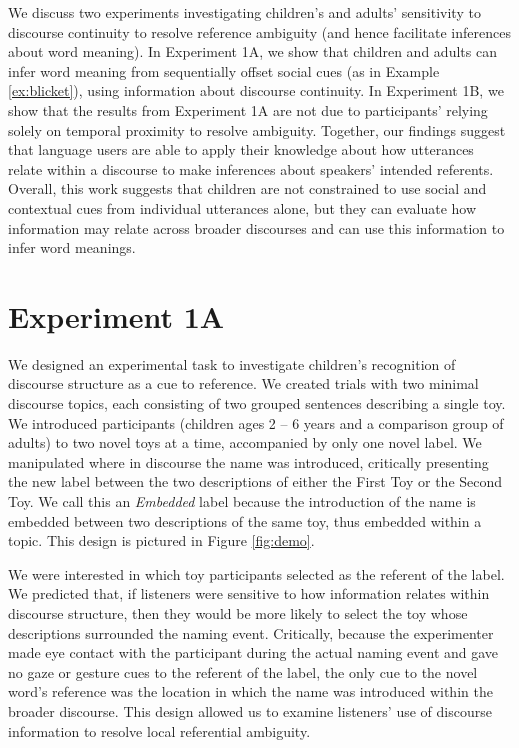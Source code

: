 \documentclass[man]{apa2}
\begin{document}
We discuss two experiments investigating children's and adults' sensitivity to discourse continuity to resolve reference ambiguity (and hence facilitate inferences about word meaning). In Experiment 1A, we show that children and adults can infer word meaning from sequentially offset social cues (as in Example \ref{ex:blicket}), using information about discourse continuity.  In Experiment 1B, we show that the results from Experiment 1A are not due to participants' relying solely on temporal proximity to resolve ambiguity.  Together, our findings suggest that language users are able to apply their knowledge about how utterances relate within a discourse to make inferences about speakers' intended referents.  Overall, this work suggests that children are not constrained to use social and contextual cues from individual utterances alone, but they can evaluate how information may relate across broader discourses and can use this information to infer word meanings.

\section{Experiment 1A}

We designed an experimental task to investigate children's recognition of discourse structure as a cue to reference. We created trials with two minimal discourse topics, each consisting of two grouped sentences describing a single toy.  We introduced participants (children ages 2 -- 6 years and a comparison group of adults) to two novel toys at a time, accompanied by only one novel label.  We manipulated where in discourse the name was introduced, critically presenting the new label between the two descriptions of either the First Toy or the Second Toy.  We call this an \emph{Embedded} label because the introduction of the name is embedded between two descriptions of the same toy, thus embedded within a topic.  This design is pictured in Figure \ref{fig:demo}.

We were interested in which toy participants selected as the referent of the label.  We predicted that, if listeners were sensitive to how information relates within discourse structure, then they would be more likely to select the toy whose descriptions surrounded the naming event.  Critically, because the experimenter made eye contact with the participant during the actual naming event and gave no gaze or gesture cues to the referent of the label, the only cue to the novel word's reference was the location in which the name was introduced within the broader discourse.  This design allowed us to examine listeners' use of discourse information to resolve local referential ambiguity.  
\end{document}
